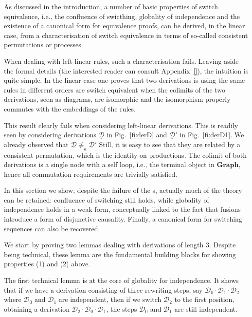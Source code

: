 \documentclass[a4paper,UKenglish,cleveref,pdftex,thm-restate,numberwithinsect,anonymous]{lipics}
\newcommand{\cat}[1]{\ensuremath{\mathbf{#1}}}
\newcommand{\dder}[1]{\mathscr{#1}}
\newcommand{\der}[1]{\underline{\dder{#1}}}
\begin{document}
As discussed in the introduction, a number of basic properties of
switch equivalence, i.e., the confluence of swicthing, globality of
independence and the existence of a canonical form for equivalence
proofs, can be derived, in the linear case, from a characterisation of
switch equivalence in terms of so-called consistent permutations or
processes.

When dealing with left-linear rules, such a characterisation fails. Leaving aside the formal details (the interested reader can consult Appendix~\ref{}), the intuition is quite simple. In the linear case one proves that two derivations is using the same rules in different orders are switch equivalent when the colimits of the two derivations, seen as diagrams, are isomorphic and the isomorphism properly commutes with the embeddings of the rules.

This result clearly fails when considering left-linear
derivations. This is readily seen by considering derivations $\der{D}$
in Fig.~\ref{fi:derD} and $\der{D}'$ in Fig.~\ref{fi:derD1}. We
already observed that $\der{D} \not\equiv_a \der{D}'$
% 
Still, it is easy to see that they are related by a consistent
permutation, which is the identity on productions. The colimit of
both derivations is a single node with a self loop, i.e., the
terminal object in $\cat{Graph}$, hence all commutation requirements
are trivially satisfied.

In this section we show, despite the failure of the s, actually much of the theory can
be retained: confluence of switching still holds, while globality of
independence holds in a weak form, conceptually linked to the fact
that fusions introduce a form of disjunctive causality. Finally, a
canonical form for switching sequences can also be recovered.

We start by proving two lemmas dealing with derivations of length
$3$. Despite being technical, these lemma are the fundamental building blocks for showing properties (1) and (2) above.

The first technical lemma is at the core of globality for independence. It shows that if we have a derivation consisting of three rewriting steps, say $\dder{D}_0\cdot \dder{D}_1 \cdot \dder{D}_2$ where $\dder{D}_0$ and $\dder{D}_1$ are independent, then if we switch $\dder{D}_2$ to the first position, 
obtaining a derivation $\dder{D}_2 \cdot  \dder{D}_0\cdot\dder{D}_1$, the steps $\dder{D}_0$ and $\dder{D}_1$ are still independent.
\end{document}
